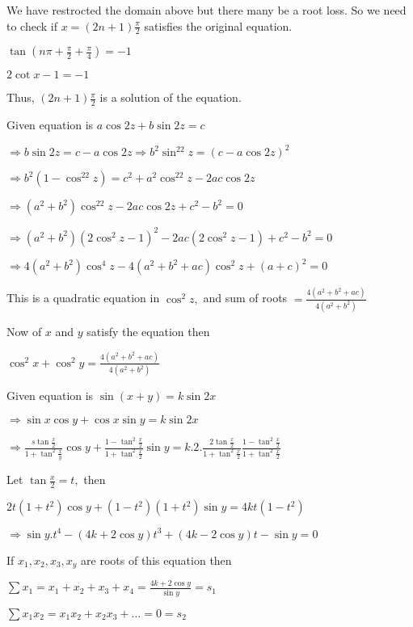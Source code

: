   We have restrocted the domain above but there many be a root loss. So we need to check if $x = (2n + 1)\frac{\pi}{2}$
  satisfies the original equation.

  $\tan\left(n\pi + \frac{\pi}{2} + \frac{\pi}{4}\right) = -1$

  $2\cot x - 1 = -1$

  Thus, $(2n + 1)\frac{\pi}{2}$ is a solution of the equation.

\item Given equation is $a\cos 2z + b\sin2z = c$

  $\Rightarrow b\sin 2z = c - a\cos2z \Rightarrow b^2\sin^22z = (c - a\cos2z)^2$

  $\Rightarrow b^2(1 - \cos^22z) = c^2 + a^2\cos^22z -2ac\cos2z$

  $\Rightarrow (a^2 + b^2)\cos^22z -2ac\cos2z + c^2 - b^2= 0$

  $\Rightarrow (a^2 + b^2)(2\cos^2z - 1)^2 - 2ac(2\cos^2z - 1) + c^2 - b^2 = 0$

  $\Rightarrow 4(a^2 + b^2)\cos^4z - 4(a^2 + b^2 + ac)\cos^2z + (a + c)^2 = 0$

  This is a quadratic equation in $\cos^2z,$ and sum of roots $= \frac{4(a^2 + b^2 + ac)}{4(a^2 + b^2)}$

  Now of $x$ and $y$ satisfy the equation then

  $\cos^2x + \cos^2y = \frac{4(a^2 + b^2 + ac)}{4(a^2 + b^2)}$

\item Given equation is $\sin(x + y) = k\sin 2x$

  $\Rightarrow \sin x\cos y + \cos x\sin y = k\sin2x$

  $\Rightarrow \frac{s\tan\frac{x}{2}}{1 + \tan^2\frac{x}{y}}\cos y + \frac{1 -\tan^2\frac{x}{2}}{1 +
  \tan^2\frac{x}{2}}\sin y = k.2.\frac{2\tan\frac{x}{2}}{1 + \tan^2\frac{x}{2}}\frac{1 - \tan^2\frac{x}{2}}{1 +
  \tan^2\frac{x}{2}}$

  Let $\tan\frac{x}{2} = t,$ then

  $2t(1 + t^2)\cos y + (1 - t^2)(1 + t^2)\sin y = 4kt(1 - t^2)$

  $\Rightarrow \sin y.t^4 - (4k + 2\cos y)t^3 + (4k - 2\cos y)t - \sin y = 0$

  If $x_1, x_2, x_3, x_y$ are roots of this equation then

  $\sum x_1 = x_1 + x_2 + x_3 + x_4 = \frac{4k + 2\cos y}{\sin y} = s_1$

  $\sum x_1x_2 = x_1x_2 + x_2x_3 + \ldots = 0 = s_2$

